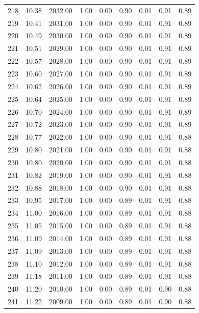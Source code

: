 \documentclass{article}\usepackage[]{graphicx}\usepackage[]{color}
\begin{document}
\begin{longtable}{rrrrrrrrr}
  218 & 10.38 & 2032.00 & 1.00 & 0.00 & 0.90 & 0.01 & 0.91 & 0.89 \\ 
  219 & 10.41 & 2031.00 & 1.00 & 0.00 & 0.90 & 0.01 & 0.91 & 0.89 \\ 
  220 & 10.49 & 2030.00 & 1.00 & 0.00 & 0.90 & 0.01 & 0.91 & 0.89 \\ 
  221 & 10.51 & 2029.00 & 1.00 & 0.00 & 0.90 & 0.01 & 0.91 & 0.89 \\ 
  222 & 10.57 & 2028.00 & 1.00 & 0.00 & 0.90 & 0.01 & 0.91 & 0.89 \\ 
  223 & 10.60 & 2027.00 & 1.00 & 0.00 & 0.90 & 0.01 & 0.91 & 0.89 \\ 
  224 & 10.62 & 2026.00 & 1.00 & 0.00 & 0.90 & 0.01 & 0.91 & 0.89 \\ 
  225 & 10.64 & 2025.00 & 1.00 & 0.00 & 0.90 & 0.01 & 0.91 & 0.89 \\ 
  226 & 10.70 & 2024.00 & 1.00 & 0.00 & 0.90 & 0.01 & 0.91 & 0.89 \\ 
  227 & 10.72 & 2023.00 & 1.00 & 0.00 & 0.90 & 0.01 & 0.91 & 0.89 \\ 
  228 & 10.77 & 2022.00 & 1.00 & 0.00 & 0.90 & 0.01 & 0.91 & 0.88 \\ 
  229 & 10.80 & 2021.00 & 1.00 & 0.00 & 0.90 & 0.01 & 0.91 & 0.88 \\ 
  230 & 10.80 & 2020.00 & 1.00 & 0.00 & 0.90 & 0.01 & 0.91 & 0.88 \\ 
  231 & 10.82 & 2019.00 & 1.00 & 0.00 & 0.90 & 0.01 & 0.91 & 0.88 \\ 
  232 & 10.88 & 2018.00 & 1.00 & 0.00 & 0.90 & 0.01 & 0.91 & 0.88 \\ 
  233 & 10.95 & 2017.00 & 1.00 & 0.00 & 0.89 & 0.01 & 0.91 & 0.88 \\ 
  234 & 11.00 & 2016.00 & 1.00 & 0.00 & 0.89 & 0.01 & 0.91 & 0.88 \\ 
  235 & 11.05 & 2015.00 & 1.00 & 0.00 & 0.89 & 0.01 & 0.91 & 0.88 \\ 
  236 & 11.09 & 2014.00 & 1.00 & 0.00 & 0.89 & 0.01 & 0.91 & 0.88 \\ 
  237 & 11.09 & 2013.00 & 1.00 & 0.00 & 0.89 & 0.01 & 0.91 & 0.88 \\ 
  238 & 11.10 & 2012.00 & 1.00 & 0.00 & 0.89 & 0.01 & 0.91 & 0.88 \\ 
  239 & 11.18 & 2011.00 & 1.00 & 0.00 & 0.89 & 0.01 & 0.91 & 0.88 \\ 
  240 & 11.20 & 2010.00 & 1.00 & 0.00 & 0.89 & 0.01 & 0.90 & 0.88 \\ 
  241 & 11.22 & 2009.00 & 1.00 & 0.00 & 0.89 & 0.01 & 0.90 & 0.88 \\ 

\end{longtable}
\end{document}
